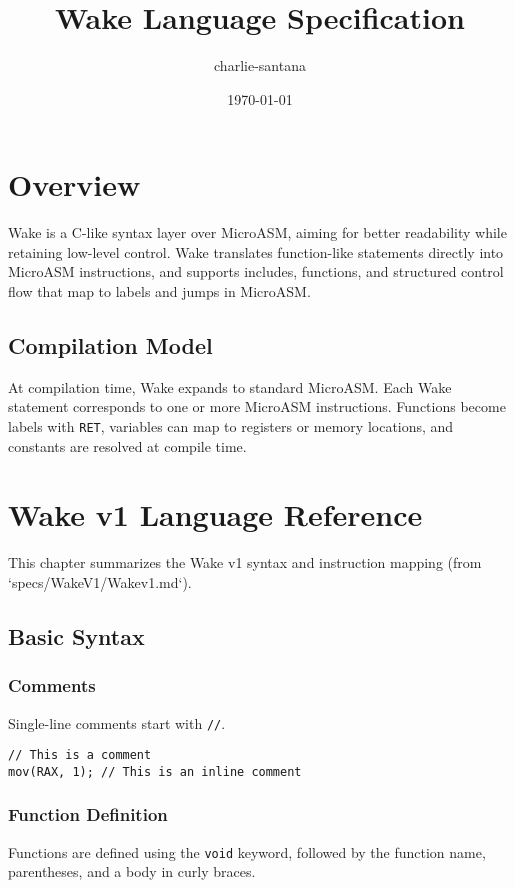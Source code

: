\documentclass[a4paper,11pt]{book}
\title{Wake Language Specification}
\author{charlie-santana}
\date{\today}
\begin{document}
\maketitle
\tableofcontents

\chapter{Overview}
Wake is a C-like syntax layer over MicroASM, aiming for better readability while retaining low-level control. Wake translates function-like statements directly into MicroASM instructions, and supports includes, functions, and structured control flow that map to labels and jumps in MicroASM.

\section*{Compilation Model}
At compilation time, Wake expands to standard MicroASM. Each Wake statement corresponds to one or more MicroASM instructions. Functions become labels with \texttt{RET}, variables can map to registers or memory locations, and constants are resolved at compile time.

\chapter{Wake v1 Language Reference}

This chapter summarizes the Wake v1 syntax and instruction mapping (from `specs/WakeV1/Wakev1.md`).

\section{Basic Syntax}

\subsection{Comments}
Single-line comments start with \texttt{//}.

\begin{lstlisting}[language=Wake,caption={Comments in Wake}]
// This is a comment
mov(RAX, 1); // This is an inline comment
\end{lstlisting}

\subsection{Function Definition}
Functions are defined using the \texttt{void} keyword, followed by the function name, parentheses, and a body in curly braces.
\end{document}
